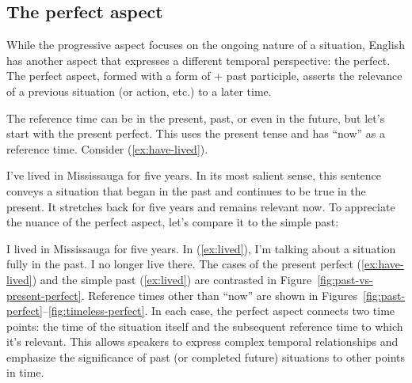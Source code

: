 \subsection{The perfect aspect}\label{sec:perfect-aspect}
While the progressive aspect focuses on the ongoing nature of a situation, English has another aspect that expresses a different temporal perspective: the perfect. The perfect aspect, formed with a form of  + past participle, asserts the relevance of a previous situation (or action, etc.) to a later time.

The reference time can be in the present, past, or even in the future, but let's start with the present perfect. This uses the present tense and has ``now'' as a reference time. Consider (\ref{ex:have-lived}).

\ea I've lived in Mississauga for five years.\label{ex:have-lived}
\z
In its most salient sense, this sentence conveys a situation that began in the past and continues to be true in the present. It stretches back for five years and remains relevant now. To appreciate the nuance of the perfect aspect, let's compare it to the simple past:

\ea I lived in Mississauga for five years.\label{ex:lived}
\z
In (\ref{ex:lived}), I'm talking about a situation fully in the past. I no longer live there. The cases of the present perfect (\ref{ex:have-lived}) and the simple past (\ref{ex:lived}) are contrasted in Figure~\ref{fig:past-vs-present-perfect}. Reference times other than \enquote{now} are shown in Figures~\ref{fig:past-perfect}--\ref{fig:timeless-perfect}. In each case, the perfect aspect connects two time points: the time of the situation itself and the subsequent reference time to which it's relevant. This allows speakers to express complex temporal relationships and emphasize the significance of past (or completed future) situations to other points in time.

